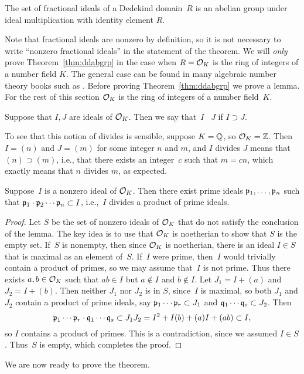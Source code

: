 \begin{theorem}\label{thm:ddabgrp}
	The set of fractional ideals of a Dedekind domain~$R$ is an
	abelian group under ideal multiplication with identity element $R$.
\end{theorem}
Note that fractional ideals are nonzero by definition, so it is not
necessary to write ``nonzero fractional ideals'' in the statement of
the theorem. We will {\em only} prove Theorem~\ref{thm:ddabgrp} in the
case when $R=\mathcal{O}_K$ is the ring of integers of a number field $K$. The
general case can be found in many algebraic number theory books such
as \cite[Ch.~3]{marcus1977number}.
Before proving Theorem~\ref{thm:ddabgrp} we prove a lemma.  For the
rest of this section $\mathcal{O}_K$ is the ring of integers of a number
field~$K$.


\begin{definition}
	Suppose that $I,J$ are ideals of $\mathcal{O}_K$.
	Then we say that~$I$ ~$J$ if $I\supset J$.
\end{definition}
To see that this notion of divides is sensible, suppose $K=\mathbb{Q}$, so
$\mathcal{O}_K=\mathbb{Z}$.  Then $I=(n)$ and $J=(m)$ for some integer $n$ and $m$, and
$I$ divides $J$ means that $(n)\supset (m)$, i.e., that there exists
an integer~$c$ such that $m=cn$, which exactly means that $n$ divides
$m$, as expected.

\begin{lemma}\label{lem:divprod}
	Suppose~$I$ is a nonzero ideal of $\mathcal{O}_K$.  Then there exist prime ideals
	$\mathfrak{p}_1,\ldots, \mathfrak{p}_n$ such that $\mathfrak{p}_1\cdot \mathfrak{p}_2\cdots \mathfrak{p}_n \subset{}I$,
	i.e.,~$I$ divides a product of prime ideals.
\end{lemma}
\begin{proof}
	Let $S$ be the set of nonzero ideals of $\mathcal{O}_K$ that do not
	satisfy the conclusion
	of the lemma.  The key idea is to use that $\mathcal{O}_K$ is noetherian to show that
	$S$ is the empty set.   If~$S$ is
	nonempty, then since $\mathcal{O}_K$ is noetherian, there is an ideal
	$I\in S$ that is maximal as an element of~$S$.  If~$I$ were prime, then~$I$
	would trivially contain a product of primes, so we may assume that~$I$
	is not prime.  Thus there exists $a,b\in \mathcal{O}_K$ such that $ab\in
	I$ but $a\not\in I$ and $b\not\in I$.  Let $J_1 = I+(a)$ and
	$J_2=I+(b)$.  Then neither $J_1$ nor $J_2$ is in $S$, since~$I$ is
	maximal, so both $J_1$ and $J_2$ contain a product of prime ideals,
	say $\mathfrak{p}_1 \cdots \mathfrak{p}_r \subset J_1$ and $\mathfrak{q}_1\cdots \mathfrak{q}_s \subset J_2$.
	Then
	$$
		\mathfrak{p}_1  \cdots \mathfrak{p}_r \cdot \mathfrak{q}_1\cdots \mathfrak{q}_s \subset
		J_1 J_2 = I^2 + I(b) + (a)I + (ab) \subset I,
	$$
	so $I$ contains a product of primes.  This is a contradiction,
	since we assumed $I\in S$.   Thus~$S$ is empty, which completes
	the proof.
\end{proof}
We are now ready to prove the theorem.

